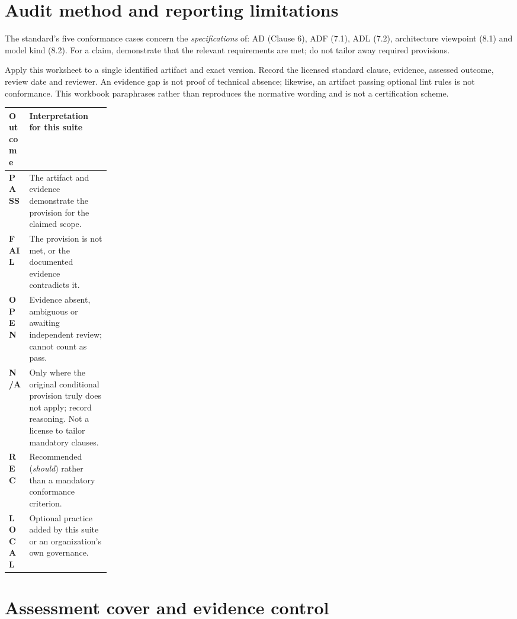 \documentclass[11pt,letterpaper]{article}
\begin{document}
\InterpretationKey
\section{Audit method and reporting limitations}
\begin{Requirement}\FlagReq{} The standard's five conformance cases concern the \emph{specifications} of: AD (Clause 6), ADF (7.1), ADL (7.2), architecture viewpoint (8.1) and model kind (8.2). For a claim, demonstrate that the relevant requirements are met; do not tailor away required provisions. \end{Requirement}
\begin{Guidance}Apply this worksheet to a single identified artifact and exact version. Record the licensed standard clause, evidence, assessed outcome, review date and reviewer. An evidence gap is not proof of technical absence; likewise, an artifact passing optional lint rules is not conformance. This workbook paraphrases rather than reproduces the normative wording and is not a certification scheme.\end{Guidance}
\begin{tabularx}{\linewidth}{p{0.20\linewidth}X}\toprule\textbf{Outcome}&\textbf{Interpretation for this suite}\\\midrule
\textbf{PASS}&The artifact and evidence demonstrate the provision for the claimed scope.\\
\textbf{FAIL}&The provision is not met, or the documented evidence contradicts it.\\
\textbf{OPEN}&Evidence absent, ambiguous or awaiting independent review; cannot count as pass.\\
\textbf{N/A}&Only where the original conditional provision truly does not apply; record reasoning. Not a license to tailor mandatory clauses.\\
\textbf{REC}&Recommended (\emph{should}) rather than a mandatory conformance criterion.\\
\textbf{LOCAL}&Optional practice added by this suite or an organization's own governance.\\\bottomrule\end{tabularx}
\section{Assessment cover and evidence control}
\end{document}
